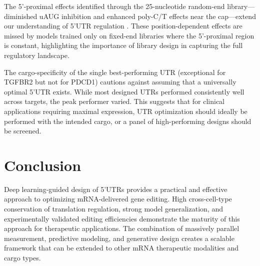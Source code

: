 \documentclass[12pt]{article}
\begin{document}
The 5'-proximal effects identified through the 25-nucleotide random-end library---diminished uAUG inhibition and enhanced poly-C/T effects near the cap---extend our understanding of 5'UTR regulation \citep{kozak1987analysis}. These position-dependent effects are missed by models trained only on fixed-end libraries where the 5'-proximal region is constant, highlighting the importance of library design in capturing the full regulatory landscape.

The cargo-specificity of the single best-performing UTR (exceptional for TGFBR2 but not for PDCD1) cautions against assuming that a universally optimal 5'UTR exists. While most designed UTRs performed consistently well across targets, the peak performer varied. This suggests that for clinical applications requiring maximal expression, UTR optimization should ideally be performed with the intended cargo, or a panel of high-performing designs should be screened.

\section{Conclusion}

Deep learning-guided design of 5'UTRs provides a practical and effective approach to optimizing mRNA-delivered gene editing. High cross-cell-type conservation of translation regulation, strong model generalization, and experimentally validated editing efficiencies demonstrate the maturity of this approach for therapeutic applications. The combination of massively parallel measurement, predictive modeling, and generative design creates a scalable framework that can be extended to other mRNA therapeutic modalities and cargo types.



\end{document}
